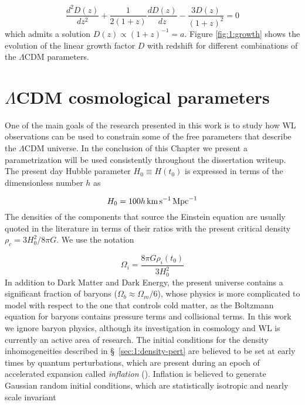 \begin{equation}
\label{eq:1:growth-diff-cold}
\frac{d^2D(z)}{dz^2} + \frac{1}{2(1+z)}\frac{dD(z)}{dz}-\frac{3D(z)}{(1+z)^2} = 0
\end{equation}
% 
which admits a solution $D(z)\propto (1+z)^{-1}=a$. Figure \ref{fig:1:growth} shows the evolution of the linear growth factor $D$ with redshift for different combinations of the $\Lambda$CDM parameters. 


\section{$\Lambda$CDM cosmological parameters}
One of the main goals of the research presented in this work is to study how WL observations can be used to constrain some of the free parameters that describe the $\Lambda$CDM universe. In the conclusion of this Chapter we present a parametrization will be used consistently throughout the dissertation writeup. The present day Hubble parameter $H_0\equiv H(t_0)$ is expressed in terms of the dimensionless number $h$ as

\begin{equation}
\label{eq:1:hubble-present}
H_0 = 100h\,{\rm km}\,{\rm s}^{-1}\,{\rm Mpc}^{-1}
\end{equation} 
%
The densities of the components that source the Einstein equation are usually quoted in the literature in terms of their ratios with the present critical density $\rho_c=3H_0^2/8\pi G$. We use the notation

\begin{equation}
\label{eq:1:omega-def}
\Omega_i = \frac{8\pi G\rho_i(t_0)}{3H_0^2}
\end{equation}
%
In addition to Dark Matter and Dark Energy, the present universe contains a significant fraction of baryons ($\Omega_b\approx \Omega_m/6$), whose physics is more complicated to model with respect to the one that controls cold matter, as the Boltzmann equation for baryons contains pressure terms and collisional terms. In this work we ignore baryon physics, although its investigation in cosmology and WL is currently an active area of research. The initial conditions for the density inhomogeneities described in \S~\ref{sec:1:density-pert} are believed to be set at early times by quantum perturbations, which are present during an epoch of accelerated expansion called \textit{inflation} (\citep{Inflation}). Inflation is believed to generate Gaussian random initial conditions, which are statistically isotropic and nearly scale invariant 

